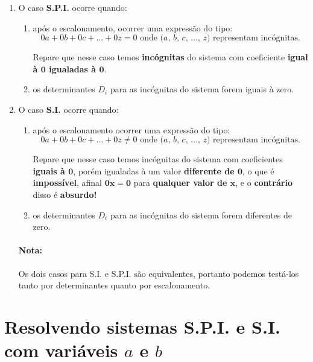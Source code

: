 \begin{enumerate}[label=(\Roman*), align=Center]
    \item O caso \textbf{S.P.I.} ocorre quando:
    \begin{enumerate}
        \item após o escalonamento, ocorrer uma expressão do tipo:
        $$
        0a+0b+0c+\dots+0z=0 \text{ onde ($a$, $b$, $c$, $\dots$, $z$) representam incógnitas.}
        $$
        
        Repare que nesse caso temos \textbf{incógnitas} do sistema com coeficiente \textbf{igual à $\mathbf{0}$ igualadas à $\mathbf{0}$}.
        
        \item os determinantes $D_i$ para as incógnitas do sistema forem iguais à zero.
    \end{enumerate}
    
    \item O caso \textbf{S.I.} ocorre quando:
    \begin{enumerate}
        \item após o escalonamento ocorrer uma expressão do tipo:
        $$
        0a+0b+0c+\dots+0z \neq 0 \text{ onde ($a$, $b$, $c$, $\dots$, $z$) representam incógnitas.}
        $$
        
        Repare que nesse caso temos incógnitas do sistema com coeficientes \textbf{iguais à $\mathbf{0}$}, porém igualadas à um valor \textbf{diferente de $\mathbf{0}$}, o que é \textbf{impossível}, afinal $\mathbf{0x=0}$ para \textbf{qualquer valor de $\mathbf{x}$}, e o \textbf{contrário} disso é \textbf{absurdo!}
        
        \item os determinantes $D_i$ para as incógnitas do sistema forem diferentes de zero.
        
    \end{enumerate}
    
    \paragraph{Nota:}
        Os dois casos para S.I. e S.P.I. são equivalentes, portanto podemos testá-los tanto por determinantes quanto por escalonamento.
\end{enumerate}

\section{Resolvendo sistemas S.P.I. e S.I. com variáveis \texorpdfstring{$a$}{a} e \texorpdfstring{$b$}{b}}

